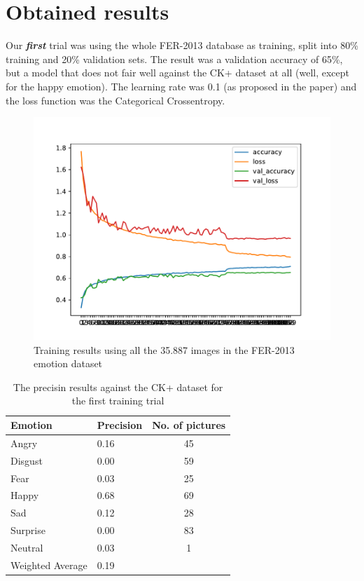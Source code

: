 \documentclass[runningheads,a4paper,11pt]{report}
\begin{document}
\section{Obtained results}
\label{section:or}
Our \textbf{\emph{first}} trial was using the whole FER-2013 database as training, split into 80\% training and 20\% validation sets. The result was a validation accuracy of 65\%, but a model that does not fair well against the CK+ dataset at all (well, except for the happy emotion). The learning rate was 0.1 (as proposed in the paper) and the loss function was the Categorical Crossentropy.
\begin{figure}[htbp]
\begin{center}
	\includegraphics[scale=0.8]{Fig/fer_training_35k.pdf}
	\caption{Training results using all the 35.887 images in the FER-2013 emotion dataset}
	\label{fer_training_35k}
\end{center}
\end{figure}

\begin{table}[htbp]
	\caption{The precisin results against the CK+ dataset for the first training trial}
	\label{fer_training_35k_ckp}
		\begin{center}
			\begin{tabular}{p{110pt}p{110pt}c}
				\textbf{Emotion}& \textbf{Precision}& \textbf{No. of pictures} \\
				\hline\hline
				Angry& 0.16& 45 \\
				Disgust& 0.00& 59 \\
				Fear& 0.03& 25 \\
				Happy& 0.68& 69 \\
				Sad& 0.12& 28 \\
				Surprise& 0.00& 83 \\
				Neutral& 0.03& 1 \\
				\hline
				Weighted Average& 0.19
			\end{tabular}
		\end{center}
\end{table}
\pagebreak
\end{document}
